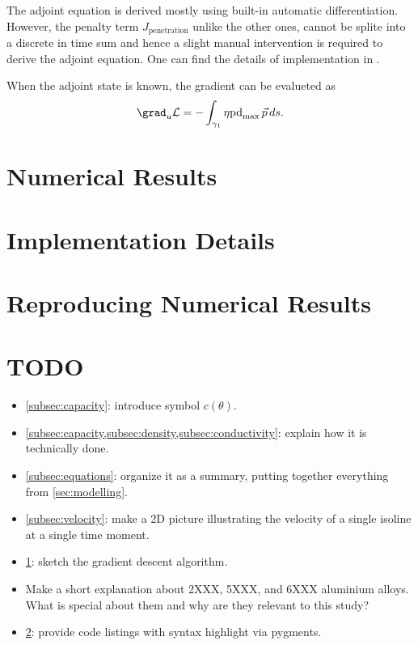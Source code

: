 The adjoint equation is derived mostly using \fenics built-in automatic differentiation. However, the penalty term $J_\text{penetration}$ unlike the other ones, cannot be splite into a discrete in time sum and hence a slight manual intervention is required to derive the adjoint equation. One can find the details of implementation in .

When the adjoint state is known, the gradient can be evalueted as
\begin{equation}
	\grad_u \mathcal{L} = - \int_{\gamma_1} \eta \text{pd}_{\max}\, \vec{p}\, ds.
\end{equation}


\section{Numerical Results}
\label{sec:numericals}

\appendix

\section{Implementation Details}
\label{sec:implementation}

\section{Reproducing Numerical Results}


\section{TODO}
\begin{itemize}
	\item \cref{subsec:capacity}: introduce symbol $c(\theta)$.
	\item \cref{subsec:capacity,subsec:density,subsec:conductivity}: explain how it is technically done.
	\item \cref{subsec:equations}: organize it as a summary, putting together everything from \cref{sec:modelling}.
	\item \cref{subsec:velocity}: make a 2D picture illustrating the velocity of a single isoline at a single time moment.
	\item \cref{sec:numericals}: sketch the gradient descent algorithm.
	\item Make a short explanation about 2XXX, 5XXX, and 6XXX aluminium alloys. What is special about them and why are they relevant to this study?
	\item \cref{sec:implementation}: provide code listings with syntax highlight via pygments.
\end{itemize}


